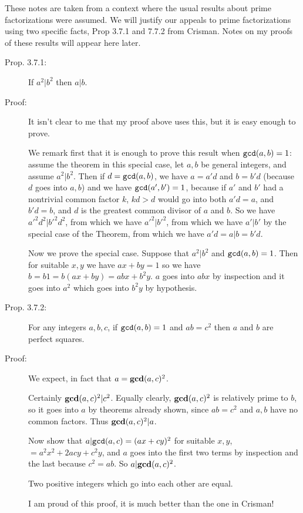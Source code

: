 \documentclass[12pt]{article}
\begin{document}
These notes are taken from a context where the usual results about prime factorizations were assumed.  We will justify our appeals
to prime factorizations using two specific facts, Prop 3.7.1 and 7.7.2 from Crisman.  Notes on my proofs of these results will appear
here later.

\begin{description}

\item[Prop. 3.7.1:]  If $a^2 | b^2$ then $a|b$.  

\item[Proof:]  It isn't clear to me that my proof above uses this, but it is easy enough to prove.

We remark first that it is enough to prove this result when ${\tt gcd}(a,b)=1$:  assume the theorem in this special case, let $a,b$ be general integers, and assume $a^2 | b^2$.  Then if $d={\tt gcd}(a,b)$, we have $a=a'd$ and $b=b'd$ (because $d$ goes into $a,b$) and we have ${\tt gcd}(a',b')=1$, because if $a'$ and $b'$ had a nontrivial common factor $k$, $kd>d$ would go into both $a'd=a$, and $b'd=b$, and $d$ is the greatest common divisor of $a$ and $b$.  So we have $a'^2d^2 | b'^2d^2$, from which we have $a'^2|b'^2$, from which we have $a'|b'$ by the special case of the Theorem, from which we have $a'd=a|b = b'd$.

Now we prove the special case.  Suppose that $a^2|b^2$ and ${\tt gcd}(a,b)=1$.  Then for suitable $x,y$ we have $ax+by=1$ so we have
$b = b1 = b(ax+by) = abx + b^2y$.  $a$ goes into $abx$ by inspection and it goes into $a^2$ which goes into $b^2y$ by hypothesis.

\item[Prop. 3.7.2:]  For any integers $a,b,c$, if ${\tt gcd}(a,b)=1$ and $ab=c^2$ then $a$ and $b$ are perfect squares.

\item[Proof:]  We expect, in fact that $a = {\bf gcd}(a,c)^2$.

Certainly ${\bf gcd}(a,c)^2 | c^2$.  Equally clearly, ${\bf gcd}(a,c)^2$ is relatively prime to $b$, so it goes into $a$ by theorems already shown, since $ab=c^2$ and $a,b$ have no common factors.  Thus ${\bf gcd}(a,c)^2 | a$.

Now show that $a|{\tt gcd}(a,c)=(ax+cy)^2$ for suitable $x,y$, $= a^2x^2 + 2acy +c^2y$, and $a$ goes into the first two terms by inspection and the last because $c^2=ab$.  So $a|{\bf gcd}(a,c)^2$.

Two positive integers which go into each other are equal.

I am proud of this proof, it is much better than the one in Crisman!

\end{description}
\end{document}

